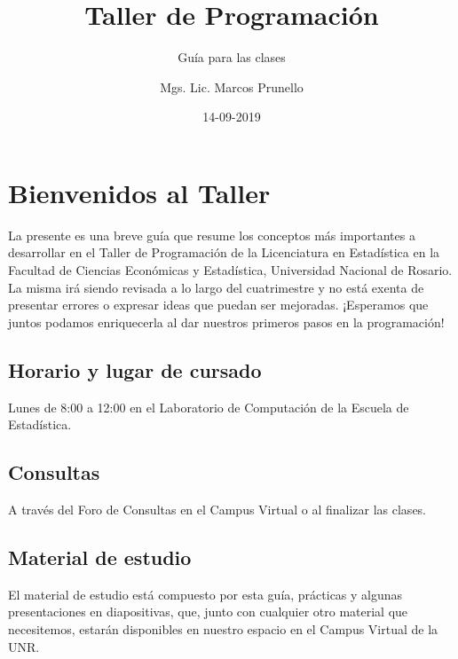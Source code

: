 \documentclass[]{book}
\title{Taller de Programación}
\subtitle{Guía para las clases}
\author{Mgs. Lic. Marcos Prunello}
\date{14-09-2019}
\begin{document}
\maketitle

{
\setcounter{tocdepth}{1}
\tableofcontents
}
\hypertarget{bienvenidos-al-taller}{%
\chapter{Bienvenidos al Taller}\label{bienvenidos-al-taller}}

La presente es una breve guía que resume los conceptos más importantes a desarrollar en el Taller de Programación de la Licenciatura en Estadística en la Facultad de Ciencias Económicas y Estadística, Universidad Nacional de Rosario. La misma irá siendo revisada a lo largo del cuatrimestre y no está exenta de presentar errores o expresar ideas que puedan ser mejoradas. ¡Esperamos que juntos podamos enriquecerla al dar nuestros primeros pasos en la programación!

\hypertarget{horario-y-lugar-de-cursado}{%
\section*{Horario y lugar de cursado}\label{horario-y-lugar-de-cursado}}

Lunes de 8:00 a 12:00 en el Laboratorio de Computación de la Escuela de Estadística.

\hypertarget{consultas}{%
\section*{Consultas}\label{consultas}}

A través del Foro de Consultas en el Campus Virtual o al finalizar las clases.

\hypertarget{material-de-estudio}{%
\section*{Material de estudio}\label{material-de-estudio}}

El material de estudio está compuesto por esta guía, prácticas y algunas presentaciones en diapositivas, que, junto con cualquier otro material que necesitemos, estarán disponibles en nuestro espacio en el Campus Virtual de la UNR.
\end{document}
